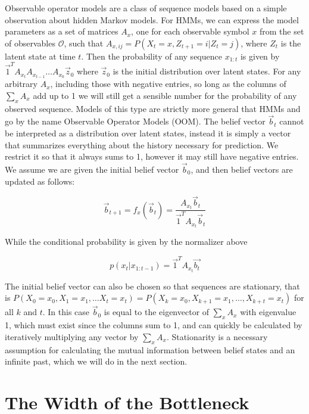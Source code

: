 \documentclass{article} %
\begin{document}
Observable operator models are a class of sequence models based on a simple observation about hidden Markov models.  For HMMs, we can express the model parameters as a set of matrices $A_x$, one for each observable symbol $x$ from the set of observables $\mathcal{O}$, such that $A_{x,ij} = P(X_t=x, Z_{t+1} = i | Z_t = j)$, where $Z_t$ is the latent state at time $t$.  Then the probability of any sequence $x_{1:t}$ is given by $\vec{1}^T A_{x_t} A_{x_{t-1}}\ldots A_{x_0} \vec{z}_0$ where $\vec{z}_0$ is the initial distribution over latent states.  For any arbitrary $A_x$, including those with negative entries, so long as the columns of $\sum_{x} A_x$ add up to 1 we will still get a sensible number for the probability of any observed sequence.  Models of this type are strictly more general that HMMs and go by the name Observable Operator Models (OOM).  The belief vector $\vec{b}_t$ cannot be interpreted as a distribution over latent states, instead it is simply a vector that summarizes everything about the history necessary for prediction.  We restrict it so that it always sums to 1, however it may still have negative entries.  We assume we are given the initial belief vector $\vec{b}_0$, and then belief vectors are updated as follows:

\begin{equation}
\vec{b}_{t+1} = f_x(\vec{b}_t) = \frac{A_{x_t}\vec{b}_t}{\vec{1}^T A_{x_t}\vec{b}_t}
\label{belief}
\end{equation}

While the conditional probability is given by the normalizer above

\begin{equation}
p(x_{t}|x_{1:t-1}) = \vec{1}^T A_{x_{t}}\vec{b_t}
\label{conditional}
\end{equation}

The initial belief vector can also be chosen so that sequences are stationary, that is $P(X_0 = x_0, X_1 = x_1,\ldots X_t = x_t) = P(X_k = x_0, X_{k+1} = x_1,\ldots,X_{k+t} = x_t)$ for all $k$ and $t$.  In this case $\vec{b}_0$ is equal to the eigenvector of $\sum_x A_x$ with eigenvalue 1, which must exist since the columns sum to 1, and can quickly be calculated by iteratively multiplying any vector by $\sum_x A_x$.  Stationarity is a necessary assumption for calculating the mutual information between belief states and an infinite past, which we will do in the next section.

\section{The Width of the Bottleneck}
\end{document}
